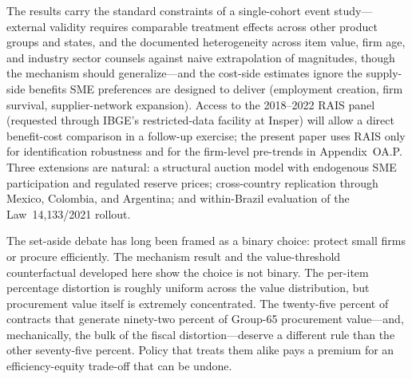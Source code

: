The results carry the standard constraints of a single-cohort event study---external validity requires comparable treatment effects across other product groups and states, and the documented heterogeneity across item value, firm age, and industry sector counsels against naive extrapolation of magnitudes, though the mechanism should generalize---and the cost-side estimates ignore the supply-side benefits SME preferences are designed to deliver (employment creation, firm survival, supplier-network expansion). Access to the 2018--2022 RAIS panel (requested through IBGE's restricted-data facility at Insper) will allow a direct benefit-cost comparison in a follow-up exercise; the present paper uses RAIS only for identification robustness and for the firm-level pre-trends in Appendix~OA.P. Three extensions are natural: a structural auction model with endogenous SME participation and regulated reserve prices; cross-country replication through Mexico, Colombia, and Argentina; and within-Brazil evaluation of the Law~14{,}133/2021 rollout.

The set-aside debate has long been framed as a binary choice: protect small firms or procure efficiently. The mechanism result and the value-threshold counterfactual developed here show the choice is not binary. The per-item percentage distortion is roughly uniform across the value distribution, but procurement value itself is extremely concentrated. The twenty-five percent of contracts that generate ninety-two percent of Group-65 procurement value---and, mechanically, the bulk of the fiscal distortion---deserve a different rule than the other seventy-five percent. Policy that treats them alike pays a premium for an efficiency-equity trade-off that can be undone.
